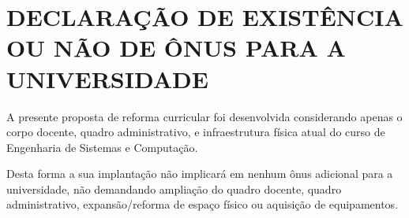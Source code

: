 \chapter*{DECLARAÇÃO DE EXISTÊNCIA OU NÃO
DE ÔNUS PARA A UNIVERSIDADE}

A presente proposta de reforma curricular foi desenvolvida considerando apenas o corpo
docente, quadro administrativo, e infraestrutura física atual do curso de Engenharia de Sistemas e Computação.

Desta forma a sua implantação não implicará em nenhum ônus adicional para a universidade,
não demandando ampliação do quadro docente, quadro administrativo, expansão/reforma de
espaço físico ou aquisição de equipamentos.